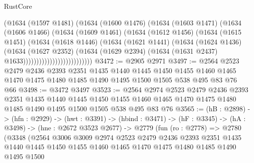 \begin{lexlean}{RustCore}
\begin{coremodule}
                              (@1634
                                (@1597 @1481)
                                (@1634
                                  (@1600 @1476)
                                  (@1634
                                    (@1603 @1471)
                                    (@1634
                                      (@1606 @1466)
                                      (@1634
                                        (@1609 @1461)
                                        (@1634
                                          (@1612 @1456)
                                          (@1634
                                            (@1615 @1451)
                                            (@1634
                                              (@1618 @1446)
                                              (@1634
                                                (@1621 @1441)
                                                (@1634
                                                  (@1624 @1436)
                                                  (@1634
                                                    (@1627 @2352)
                                                    (@1634
                                                      (@1629 @2394)
                                                      (@1634
                                                        (@1631 @2437)
                                                        @1633))))))))))))))))))))))))))
@3472 := @2905 @2971
@3497 := @2564
    @2523
    @2479
    @2436
    @2393
    @2351
    @1435
    @1440
    @1445
    @1450
    @1455
    @1460
    @1465
    @1470
    @1475
    @1480
    @1485
    @1490
    @1495
    @1500
    @1505
    @538
    @495
    @83
    @76
    @66
@3498 := @3472 @3497
@3523 := @2564
    @2974
    @2523
    @2479
    @2436
    @2393
    @2351
    @1435
    @1440
    @1445
    @1450
    @1455
    @1460
    @1465
    @1470
    @1475
    @1480
    @1485
    @1490
    @1495
    @1500
    @1505
    @538
    @495
    @83
    @76
@3565 := (hB : @2898) ->
  (hfn : @2929) ->
  (hwt : @3391) ->
  (hbind : @3471) ->
  (hF : @3345) ->
  (hA : @3498) ->
  (hne : @2672 @3523 @2677) ->
  @2779
    (fun (ro : @2778) =>
    @2780
      (@3348
        (@2564
          @3006
          @3009
          @2974
          @2523
          @2479
          @2436
          @2393
          @2351
          @1435
          @1440
          @1445
          @1450
          @1455
          @1460
          @1465
          @1470
          @1475
          @1480
          @1485
          @1490
          @1495
          @1500

\end{coremodule}
\end{lexlean}
